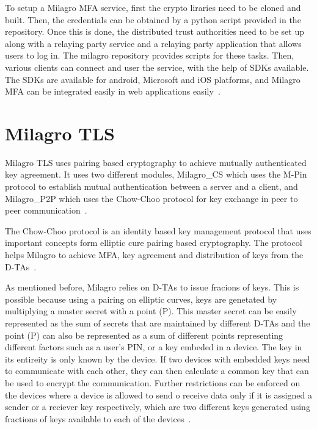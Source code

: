 To setup a Milagro MFA service, first the crypto liraries need to be
cloned and built. Then, the credentials can be obtained by a python
script provided in the repository.  Once this is done, the distributed
trust authorities need to be set up along with a relaying party
service and a relaying party application that allows users to log
in. The milagro repository provides scripts for these tasks. Then,
various clients can connect and user the service, with the help of
SDKs available. The SDKs are available for android, Microsoft and iOS
platforms, and Milagro MFA can be integrated easily in web
applications easily~\cite{mfa-install}.


\section{Milagro TLS}

Milagro TLS uses pairing based cryptography to achieve mutually
authenticated key agreement. It uses two different modules,
Milagro\_CS which uses the M-Pin protocol to establish mutual
authentication between a server and a client, and Milagro\_P2P which
uses the Chow-Choo protocol for key exchange in peer to peer
communication~\cite{mtls-white-paper}.


The Chow-Choo protocol is an identity based key management protocol
that uses important concepts form elliptic cure pairing based
cryptography. The protocol helps Milagro to achieve MFA, key agreement
and distribution of keys from the D-TAs~\cite{milagro-protocols}.


As mentioned before, Milagro relies on D-TAs to issue fracions of
keys. This is possible because using a pairing on elliptic curves,
keys are genetated by multiplying a master secret with a point
(P). This master secret can be easily represented as the sum of
secrets that are maintained by different D-TAs and the point (P) can
also be represented as a sum of different points representing
different factors such as a user's PIN, or a key embeded in a
device. The key in its entireity is only known by the device. If two
devices with embedded keys need to communicate with each other, they
can then calculate a common key that can be used to encrypt the
communication. Further restrictions can be enforced on the devices
where a device is allowed to send o receive data only if it is
assigned a sender or a reciever key respectively, which are two
different keys generated using fractions of keys available to each of
the devices~\cite{milagro-protocols}.


